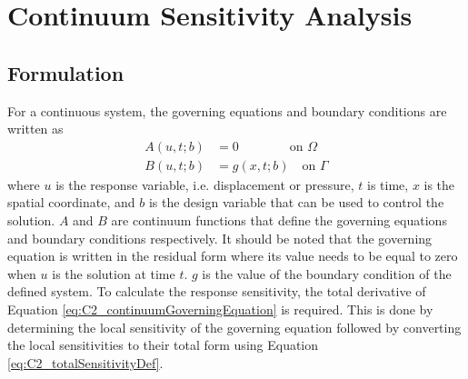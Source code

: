 \section{Continuum Sensitivity Analysis}
\subsection{Formulation}
For a continuous system, the governing equations and boundary conditions are written as
%
\begin{subequations}\label{eq:C2_continuumGoverningEquation}
\begin{align}
    A(u, t; b) &= 0 \qquad \qquad \text{on } \Omega \\
    B(u, t; b) &= g(x, t; b) \quad \text{on } \Gamma
\end{align}    
\end{subequations}
%
where $u$ is the response variable, i.e. displacement or pressure, $t$ is time, $x$ is the spatial coordinate, and $b$ is the design variable that can be used to control the solution. $A$ and $B$ are continuum functions that define the governing equations and boundary conditions respectively. It should be noted that the governing equation is written in the residual form where its value needs to be equal to zero when $u$ is the solution at time $t$. $g$ is the value of the boundary condition of the defined system. To calculate the response sensitivity, the total derivative of Equation \eqref{eq:C2_continuumGoverningEquation} is required. This is done by determining the local sensitivity of the governing equation followed by converting the local sensitivities to their total form using Equation \eqref{eq:C2_totalSensitivityDef}.


